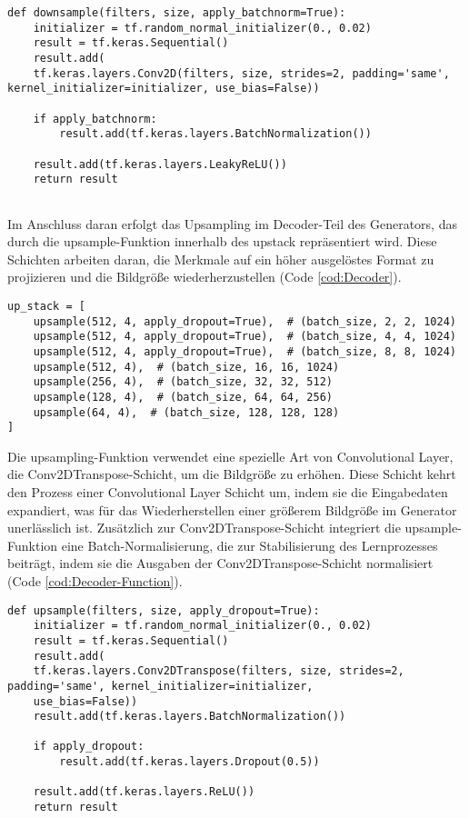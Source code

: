 \begin{lstlisting}[language=pyhaff, caption={Downsampling-Schicht in Pix2Pix}, label={cod:Encoder-Function}]
def downsample(filters, size, apply_batchnorm=True):
	initializer = tf.random_normal_initializer(0., 0.02)
	result = tf.keras.Sequential()
	result.add(
	tf.keras.layers.Conv2D(filters, size, strides=2, padding='same', kernel_initializer=initializer, use_bias=False))
	
	if apply_batchnorm:
		result.add(tf.keras.layers.BatchNormalization())
	
	result.add(tf.keras.layers.LeakyReLU())
	return result
	
\end{lstlisting}


Im Anschluss daran erfolgt das Upsampling im Decoder-Teil des Generators, das durch die upsample-Funktion innerhalb des upstack repräsentiert wird. Diese Schichten arbeiten daran, die Merkmale auf ein höher ausgelöstes Format zu projizieren und die Bildgröße wiederherzustellen (Code \ref{cod:Decoder}).

\begin{lstlisting}[language=pyhaff, caption={Upsampling-Schritt in Pix2Pix}, label={cod:Decoder}]
up_stack = [
	upsample(512, 4, apply_dropout=True),  # (batch_size, 2, 2, 1024)
	upsample(512, 4, apply_dropout=True),  # (batch_size, 4, 4, 1024)
	upsample(512, 4, apply_dropout=True),  # (batch_size, 8, 8, 1024)
	upsample(512, 4),  # (batch_size, 16, 16, 1024)
	upsample(256, 4),  # (batch_size, 32, 32, 512)
	upsample(128, 4),  # (batch_size, 64, 64, 256)
	upsample(64, 4),  # (batch_size, 128, 128, 128)
]
\end{lstlisting}

Die upsampling-Funktion verwendet eine spezielle Art von Convolutional Layer, die Conv2DTranspose-Schicht, um die Bildgröße zu erhöhen. Diese Schicht kehrt den Prozess einer Convolutional Layer Schicht um, indem sie die Eingabedaten expandiert, was für das Wiederherstellen einer größerem Bildgröße im Generator unerlässlich ist. Zusätzlich zur Conv2DTranspose-Schicht integriert die upsample-Funktion eine Batch-Normalisierung, die zur Stabilisierung des Lernprozesses beiträgt, indem sie die Ausgaben der Conv2DTranspose-Schicht normalisiert (Code \ref{cod:Decoder-Function}). 

\begin{lstlisting}[language=pyhaff, caption={Upsampling-Schritt in Pix2Pix}, label={cod:Decoder-Function}]
def upsample(filters, size, apply_dropout=True):
	initializer = tf.random_normal_initializer(0., 0.02)
	result = tf.keras.Sequential()
	result.add(
	tf.keras.layers.Conv2DTranspose(filters, size, strides=2, padding='same', kernel_initializer=initializer, 
	use_bias=False))
	result.add(tf.keras.layers.BatchNormalization())
	
	if apply_dropout:
		result.add(tf.keras.layers.Dropout(0.5))
	
	result.add(tf.keras.layers.ReLU())
	return result
\end{lstlisting} 

